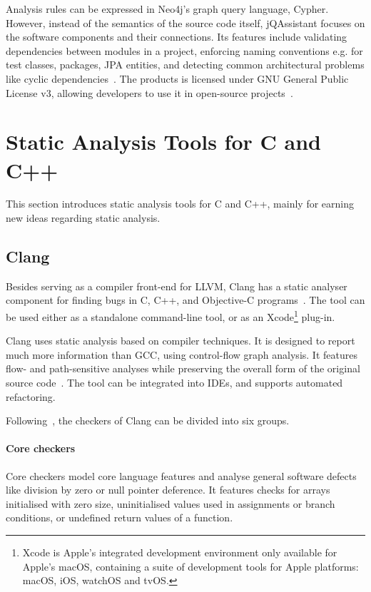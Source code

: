 Analysis rules can be expressed in Neo4j's graph query language, Cypher. However, instead of the semantics of the source code itself, jQAssistant focuses on the software components and their connections. Its features include validating dependencies between modules in a project, enforcing naming conventions e.g. for test classes, packages, JPA entities, and detecting common architectural problems like cyclic dependencies~\cite{jqassistant-documentation}. The products is licensed under GNU General Public License v3, allowing developers to use it in open-source projects~\cite{gplv3}.


\section{Static Analysis Tools for C and C++}

This section introduces static analysis tools for C and C++, mainly for earning new ideas regarding static analysis.


\subsection{Clang}

Besides serving as a compiler front-end for LLVM, Clang has a static analyser component for finding bugs in C, C++, and Objective-C programs~\cite{clang-analyser-website}. The tool can be used either as a standalone command-line tool, or as an Xcode\footnote{Xcode is Apple's integrated development environment only available for Apple's macOS, containing a suite of development tools for Apple platforms: macOS, iOS, watchOS and tvOS.} plug-in.

Clang uses static analysis based on compiler techniques. It is designed to report much more information than GCC, using control-flow graph analysis. It features flow- and path-sensitive analyses while preserving the overall form of the original source code~\cite{kremenek2008finding}. The tool can be integrated into IDEs, and supports automated refactoring.

Following~\cite{clang-analyser-website}, the checkers of Clang can be divided into six groups.

\paragraph{Core checkers} Core checkers model core language features and analyse general software defects like division by zero or null pointer deference. It features checks for arrays initialised with zero size, uninitialised values used in assignments or branch conditions, or undefined return values of a function.

